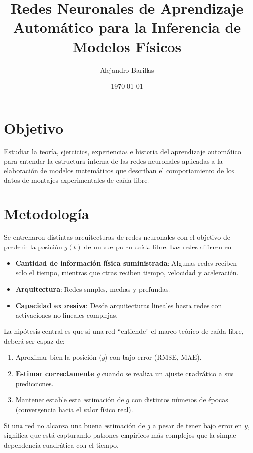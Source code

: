 \documentclass[11pt]{article}
\title{\textbf{Redes Neuronales de Aprendizaje Automático para
		la Inferencia de Modelos Físicos}}
\author{Alejandro Barillas}
\date{\today}
\begin{document}
	
	\maketitle
	
	\section{Objetivo}
	Estudiar la teoría, ejercicios, experiencias e historia del aprendizaje automático
	para entender la estructura interna de las redes neuronales aplicadas a la 
	elaboración de modelos matemáticos que describan el comportamiento de los datos
	de montajes experimentales de caída libre.
	
	\section{Metodología}
	Se entrenaron distintas arquitecturas de redes neuronales con el objetivo de predecir la posición $y(t)$ de un cuerpo en caída libre. Las redes difieren en:
	\begin{itemize}
		\item \textbf{Cantidad de información física suministrada}: Algunas redes reciben solo el tiempo, mientras que otras reciben tiempo, velocidad y aceleración.
		\item \textbf{Arquitectura}: Redes simples, medias y profundas.
		\item \textbf{Capacidad expresiva}: Desde arquitecturas lineales hasta redes con activaciones no lineales complejas.
	\end{itemize}
	
	La hipótesis central es que si una red \enquote{entiende} el marco teórico de caída libre, deberá ser capaz de:
	\begin{enumerate}
		\item Aproximar bien la posición ($y$) con bajo error (RMSE, MAE).
		\item \textbf{Estimar correctamente} $g$ cuando se realiza un ajuste cuadrático a sus predicciones.
		\item Mantener estable esta estimación de $g$ con distintos números de épocas (convergencia hacia el valor físico real).
	\end{enumerate}
	
	Si una red no alcanza una buena estimación de $g$ a pesar de tener bajo error en $y$, significa que está capturando patrones empíricos más complejos que la simple dependencia cuadrática con el tiempo.
	
\end{document}
